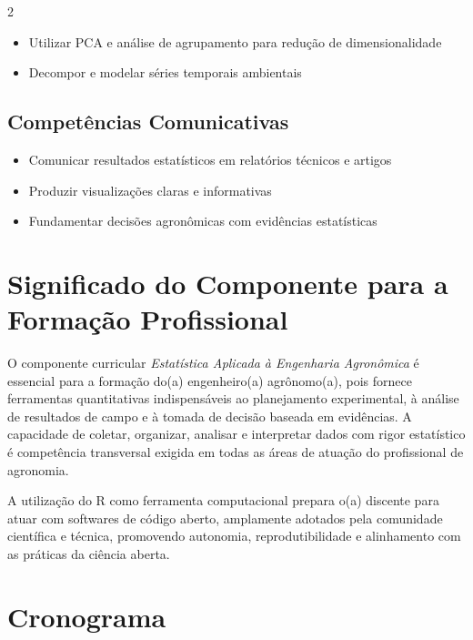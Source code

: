 \documentclass[11pt,a4paper]{article}
\begin{document}
\begin{multicols}{2}
\begin{itemize}
\item Utilizar PCA e análise de agrupamento para redução de dimensionalidade

\item Decompor e modelar séries temporais ambientais

\end{itemize}

\subsection*{Competências Comunicativas}

\begin{itemize}

\item Comunicar resultados estatísticos em relatórios técnicos e artigos

\item Produzir visualizações claras e informativas

\item Fundamentar decisões agronômicas com evidências estatísticas

\end{itemize}

\end{multicols}

\section*{Significado do Componente para a Formação Profissional}

O componente curricular \textit{Estatística Aplicada à Engenharia Agronômica} é essencial para a formação do(a) engenheiro(a) agrônomo(a), pois fornece ferramentas quantitativas indispensáveis ao planejamento experimental, à análise de resultados de campo e à tomada de decisão baseada em evidências. A capacidade de coletar, organizar, analisar e interpretar dados com rigor estatístico é competência transversal exigida em todas as áreas de atuação do profissional de agronomia.

A utilização do R como ferramenta computacional prepara o(a) discente para atuar com softwares de código aberto, amplamente adotados pela comunidade científica e técnica, promovendo autonomia, reprodutibilidade e alinhamento com as práticas da ciência aberta.

\section*{Cronograma}
\end{document}
